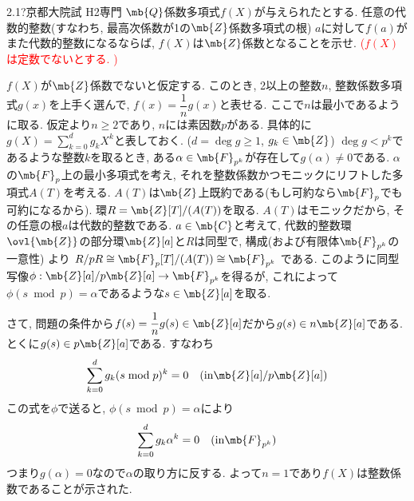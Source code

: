 \begin{prob}{2.1}{\hosi ?}{京都大院試 H2専門}
$\mb{Q}$係数多項式$f(X)$が与えられたとする. 任意の代数的整数(すなわち, 最高次係数が1の$\mb{Z}$係数多項式の根) $a$に対して$f(a)$がまた代数的整数になるならば, $f(X)$は$\mb{Z}$係数となることを示せ. \textcolor{red}{($f(X)$は定数でないとする. )}
\end{prob}
$f(X)$が$\mb{Z}$係数でないと仮定する. このとき, 2以上の整数$n$, 整数係数多項式$g(x)$を上手く選んで, $f(x) = \dfrac{1}{n} g(x)$と表せる.
 ここで$n$は最小であるように取る. 仮定より$n\geq 2$であり, $n$には素因数$p$がある. 具体的に$g(X) = \sum_{k=0}^{d} g_k X^{k}$と表しておく. ($d = \deg{g} \geq 1$, $g_k \in \mb{Z}$)
 $\deg{g} < p^{k}$であるような整数$k$を取るとき, ある$\alpha\in \mb{F}_{p^{k}}$が存在して$g(\alpha)\neq 0$である. $\alpha$の$\mb{F}_{p}$上の最小多項式を考え, それを整数係数かつモニックにリフトした多項式$A(T)$を考える. $A(T)$は$\mb{Z}$上既約である(もし可約なら$\mb{F}_{p}$でも可約になるから). 環$R=\mb{Z}[T]/(A(T))$を取る. $A(T)$はモニックだから, その任意の根$a$は代数的整数である.  $a\in \mb{C}$と考えて, 代数的整数環$\ovl{\mb{Z}}$の部分環$\mb{Z}[a]$と$R$は同型で,  構成(および有限体$\mb{F}_{p^{k}}$の一意性) より $R/pR \cong \mb{F}_{p}[T]/(A(T)) \cong \mb{F}_{p^{k}}$ である. このように同型写像$\phi:\mb{Z}[a]/p\mb{Z}[a] \to \mb{F}_{p^{k}}$を得るが, これによって$\phi(s\bmod{p}) = \alpha$であるような$s\in \mb{Z}[a]$を取る.   \par
さて, 問題の条件から$f(s) = \dfrac{1}{n} g(s) \in \mb{Z}[a]$だから$g(s)\in n\mb{Z}[a]$である. とくに$g(s) \in p\mb{Z}[a]$である. すなわち
\[
\sum_{k=0}^{d} g_k (s\bmod{p})^{k} = 0 \quad (\text{in}  \mb{Z}[a]/p\mb{Z}[a])
\]
この式を$\phi$で送ると, $\phi(s\bmod{p}) = \alpha$により
\[
\sum_{k=0}^{d} g_k \alpha^{k} = 0 \quad (\text{in} \mb{F}_{p^{k}})
\]
つまり$g(\alpha) = 0$なので$\alpha$の取り方に反する. よって$n=1$であり$f(X)$は整数係数であることが示された.
